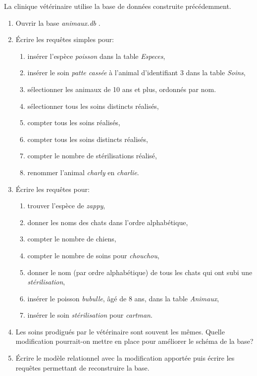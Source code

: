 \documentclass[a4paper,11pt]{article}
\begin{document}
\begin{Form}
\begin{exo}
La clinique vétérinaire utilise la base de données construite précédemment.
\begin{enumerate}
\item Ouvrir la base \emph{animaux.db} .
\item Écrire les requêtes simples pour:
\begin{enumerate}
\item insérer l'espèce \emph{poisson} dans la table \emph{Especes},
\item insérer le soin \emph{patte cassée} à l'animal d'identifiant 3 dans la table \emph{Soins},
\item sélectionner les animaux de 10 ans et plus, ordonnés par nom.
\item sélectionner tous les soins distincts réalisés,
\item compter tous les soins réalisés,
\item compter tous les soins distincts réalisés,
\item compter le nombre de stérilisations réalisé,
\item renommer l'animal \emph{charly} en \emph{charlie}.
\end{enumerate}
\item Écrire les requêtes pour:
\begin{enumerate}
\item trouver l'espèce de \emph{zappy},
\item donner les noms des chats dans l'ordre alphabétique,
\item compter le nombre de chiens,
\item compter le nombre de soins pour \emph{chouchou},
\item donner le nom (par ordre alphabétique) de tous les chats qui ont subi une \emph{stérilisation},
\item insérer le poisson \emph{bubulle}, âgé de 8 ans, dans la table \emph{Animaux},
\item insérer le soin \emph{stérilisation} pour \emph{cartman}.
\end{enumerate}
\item Les soins prodigués par le vétérinaire sont souvent les mêmes. Quelle modification pourrait-on mettre en place pour améliorer le schéma de la base?
\item Écrire le modèle relationnel avec la modification apportée puis écrire les requêtes permettant de reconstruire la base.
\end{enumerate}
\end{exo}
\end{Form}
\end{document}
